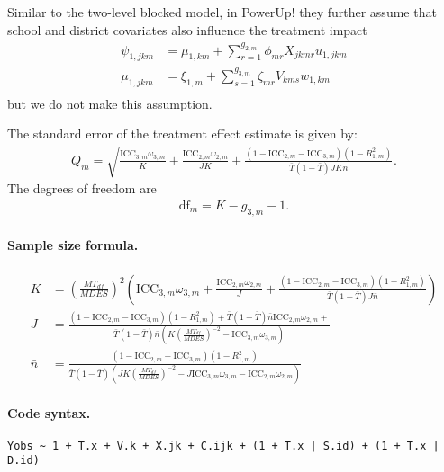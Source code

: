 \documentclass[12pt]{article}
\begin{document}
Similar to the two-level blocked model, in PowerUp! they further assume that school and district covariates also influence the treatment impact
\begin{align*}
\psi_{1,jkm} &= \mu_{1,km} + \sum_{r=1}^{g_{2,m}} \phi_{mr} X_{jkmr} u_{1,jkm}\\
\mu_{1,jkm} &= \xi_{1,m} + \sum_{s=1}^{g_{3,m}} \zeta_{mr} V_{kms} w_{1,km}\\
\end{align*}
but we do not make this assumption.


The standard error of the treatment effect estimate is given by:
\begin{align}Q_m = \sqrt{
\frac{\text{ICC}_{3,m} \omega_{3,m}}{K} +
\frac{\text{ICC}_{2,m} \omega_{2,m}}{JK} +
\frac{(1-\text{ICC}_{2,m} - \text{ICC}_{3,m})(1-R^2_{1,m})}{\bar{T}(1 - \bar{T}) JK\bar{n}}
}.\end{align}
The degrees of freedom are
\begin{align}\text{df}_m = K - g_{3,m} - 1.\end{align}


\paragraph{Sample size formula.} 
\begin{align}
K &= \left(\frac{MT_{df}}{MDES}\right)^2 \left(\text{ICC}_{3,m} \omega_{3,m} + \frac{\text{ICC}_{2,m} \omega_{2,m}}{J} + \frac{(1-\text{ICC}_{2,m}-\text{ICC}_{3,m})(1-R^2_{1,m})}{\bar{T}(1 - \bar{T}) J \bar{n}} \right)\\
J &= \frac{(1-\text{ICC}_{2,m}-\text{ICC}_{3,m})(1-R^2_{1,m}) + \bar{T}(1 - \bar{T}) \bar{n}\text{ICC}_{2,m} \omega_{2,m} + }{\bar{T}(1 - \bar{T}) \bar{n}\left(K \left(\frac{MT_{df}}{MDES}\right)^{-2} - \text{ICC}_{3,m} \omega_{3,m}\right)}\\
\bar{n} &= \frac{(1-\text{ICC}_{2,m}-\text{ICC}_{3,m})(1-R^2_{1,m})}{\bar{T}(1 - \bar{T})\left(JK \left(\frac{MT_{df}}{MDES}\right)^{-2} - J\text{ICC}_{3,m} \omega_{3,m} - \text{ICC}_{2,m} \omega_{2,m}\right)}
\end{align}

\paragraph{Code syntax.}
\begin{verbatim}
Yobs ~ 1 + T.x + V.k + X.jk + C.ijk + (1 + T.x | S.id) + (1 + T.x | D.id) 
\end{verbatim}
\end{document}
